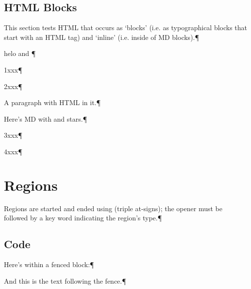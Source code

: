 

\section{HTML Blocks
}
This section tests HTML that occurs as ‘blocks’ (i.e. as typographical blocks
that start with an HTML tag) and ‘inline’ (i.e. inside of MD blocks).¶\par
helo  and ¶\par
1xxx¶\par
2xxx¶\par
A paragraph with  HTML in it.¶\par
Here’s MD with  and  stars.¶\par
3xxx¶\par
4xxx¶\par

\chapter{Regions
}
Regions are started and ended using  (triple at-signs); the opener
must be followed by a key word indicating the region’s type.¶\par

\section{Code
}
Here’s  within a fenced block:¶\par
{}And this is the text following the fence.¶\par
